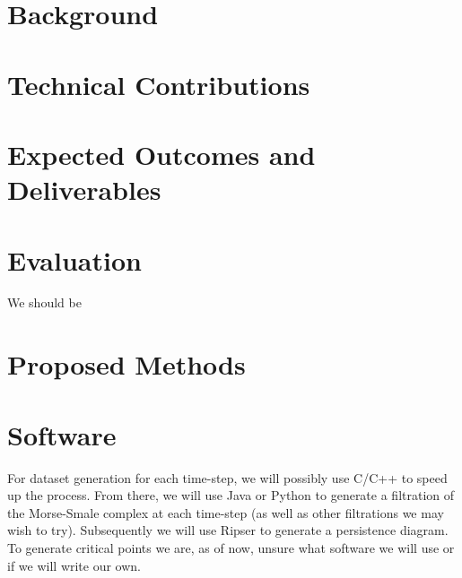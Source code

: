 \documentclass[12pt, fullpage,letterpaper]{article}
\begin{document}
	\section*{\normalfont Background} 
	
	  
	\section*{\normalfont Technical Contributions} 
	
	
	\section*{\normalfont Expected Outcomes and Deliverables}  
	
	\section*{\normalfont Evaluation}  
	We should be 
	
	
	\section*{\normalfont Proposed Methods}  

	\section*{\normalfont Software}  
	
	For dataset generation for each time-step, we will possibly use C/C++ to speed up the process. From there, we will use Java or Python to generate a filtration of the Morse-Smale complex at each time-step (as well as other filtrations we may wish to try). Subsequently we will use Ripser to generate a persistence diagram. To generate critical points we are, as of now, unsure what software we will use or if we will write our own.
	
\end{document}
